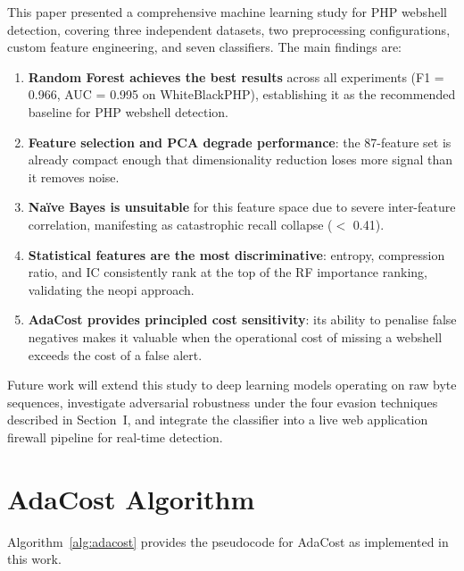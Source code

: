 \documentclass[journal,twocolumn]{IEEEtran}
\begin{document}
This paper presented a comprehensive machine learning study for PHP webshell detection, covering three independent datasets, two preprocessing configurations, custom feature engineering, and seven classifiers. The main findings are:

\begin{enumerate}
  \item \textbf{Random Forest achieves the best results} across all experiments (F1 = 0.966, AUC = 0.995 on WhiteBlackPHP), establishing it as the recommended baseline for PHP webshell detection.
  \item \textbf{Feature selection and PCA degrade performance}: the 87-feature set is already compact enough that dimensionality reduction loses more signal than it removes noise.
  \item \textbf{Na\"{i}ve Bayes is unsuitable} for this feature space due to severe inter-feature correlation, manifesting as catastrophic recall collapse ($<$ 0.41).
  \item \textbf{Statistical features are the most discriminative}: entropy, compression ratio, and IC consistently rank at the top of the RF importance ranking, validating the neopi approach.
  \item \textbf{AdaCost provides principled cost sensitivity}: its ability to penalise false negatives makes it valuable when the operational cost of missing a webshell exceeds the cost of a false alert.
\end{enumerate}

Future work will extend this study to deep learning models operating on raw byte sequences, investigate adversarial robustness under the four evasion techniques described in Section~I, and integrate the classifier into a live web application firewall pipeline for real-time detection.

\appendix

\section{AdaCost Algorithm}

Algorithm~\ref{alg:adacost} provides the pseudocode for AdaCost as implemented in this work.
\end{document}
